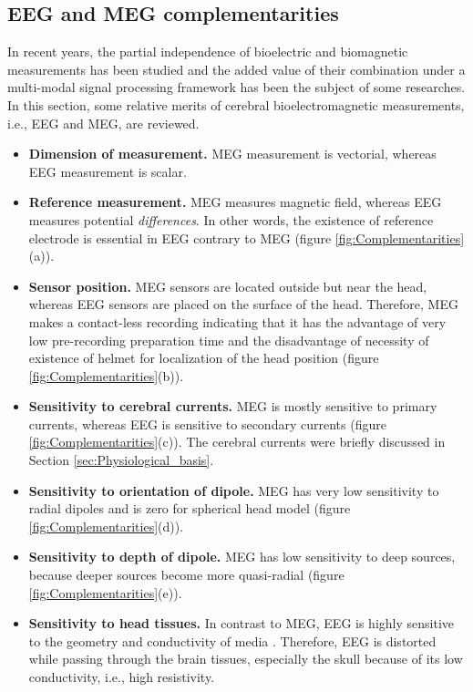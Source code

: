 \subsection{EEG and MEG complementarities}
\label{sec:EMEG_Complementarities} 
In recent years, the partial independence of bioelectric and biomagnetic measurements has been studied and the added value of their combination under a multi-modal signal processing framework has been the subject of some researches.
In this section, some relative merits of cerebral bioelectromagnetic measurements, i.e., EEG and MEG, are reviewed.
\begin{itemize}
\item \textbf{Dimension of measurement.} MEG measurement is vectorial, whereas EEG measurement is scalar.
\item \textbf{Reference measurement.} MEG measures magnetic field, whereas EEG measures potential \emph{differences}.
In other words, the existence of reference electrode is essential in EEG contrary to MEG (figure \ref{fig:Complementarities}(a)).
\item \textbf{Sensor position.} MEG sensors are located outside but near the head, whereas EEG sensors are placed on the surface of the head.
Therefore, MEG makes a contact-less recording indicating that it has the advantage of very low pre-recording preparation time and the disadvantage of necessity of existence of helmet for localization of the head position (figure \ref{fig:Complementarities}(b)).
\item \textbf{Sensitivity to cerebral currents.} MEG is mostly sensitive to primary currents, whereas EEG is sensitive to secondary currents (figure \ref{fig:Complementarities}(c)).
The cerebral currents were briefly discussed in Section \ref{sec:Physiological_basis}.
\item \textbf{Sensitivity to orientation of dipole.} MEG has very low sensitivity to radial dipoles and is zero for spherical head model \cite{Ahlfors2010} (figure \ref{fig:Complementarities}(d)).
\item \textbf{Sensitivity to depth of dipole.} MEG has low sensitivity to deep sources, because deeper sources become more quasi-radial (figure \ref{fig:Complementarities}(e)).
\item \textbf{Sensitivity to head tissues.} In contrast to MEG, EEG is highly sensitive to the geometry and conductivity of media \cite{Acar2003,Gencer2004}.
Therefore, EEG is distorted while passing through the brain tissues, especially the skull because of its low conductivity, i.e., high resistivity.


\end{itemize}
